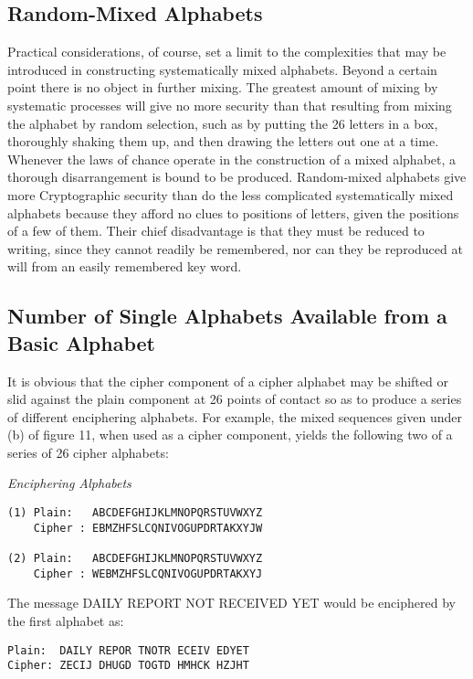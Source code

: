 \subsection{Random-Mixed Alphabets}

Practical considerations, of course, set a limit to the complexities that
may be introduced in constructing systematically mixed alphabets.
Beyond a certain point there is no object in further mixing. The greatest
amount of mixing by systematic processes will give no more security
than that resulting from mixing the alphabet by random selection, such
as by putting the 26 letters in a box, thoroughly shaking them up, and
then drawing the letters out one at a time. Whenever the laws of chance
operate in the construction of a mixed alphabet, a thorough disarrangement is bound to be produced. Random-mixed alphabets give more
Cryptographic security than do the less complicated systematically mixed
alphabets because they afford no clues to positions of letters, given the
positions of a few of them. Their chief disadvantage is that they must be
reduced to writing, since they cannot readily be remembered, nor can
they be reproduced at will from an easily remembered key word.

\subsection{Number of Single Alphabets Available from a Basic Alphabet}

It is obvious that the cipher component of a cipher alphabet may be
shifted or slid against the plain component at 26 points of contact so as
to produce a series of different enciphering alphabets. For example, the
mixed sequences given under (b) of ﬁgure 11, when used as a cipher
component, yields the following two of a series of 26 cipher alphabets:

\begin{center}
\textit{Enciphering Alphabets}
\end{center}

\begin{verbatim}
(1) Plain:   ABCDEFGHIJKLMNOPQRSTUVWXYZ
    Cipher : EBMZHFSLCQNIVOGUPDRTAKXYJW

(2) Plain:   ABCDEFGHIJKLMNOPQRSTUVWXYZ
    Cipher : WEBMZHFSLCQNIVOGUPDRTAKXYJ
\end{verbatim}

The message DAILY REPORT NOT RECEIVED YET would be
enciphered by the ﬁrst alphabet as:

\begin{verbatim}
Plain:  DAILY REPOR TNOTR ECEIV EDYET
Cipher: ZECIJ DHUGD TOGTD HMHCK HZJHT
\end{verbatim}

